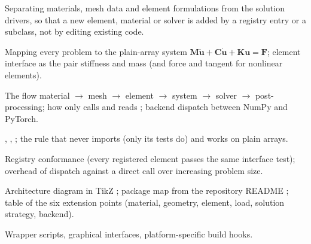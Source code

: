 \begin{description}[style=nextline,leftmargin=1em]
\item[Focus] Separating materials, mesh data and element formulations from the solution drivers, so that a new element, material or solver is added by a registry entry or a subclass, not by editing existing code.
\item[Mathematics] Mapping every problem to the plain-array system $\bm{M}\ddot{\bm u}+\bm{C}\dot{\bm u}+\bm{K}\bm u=\bm F$; element interface as the pair stiffness and mass (and force and tangent for nonlinear elements).
\item[Algorithm] The flow material $\to$ mesh $\to$ element $\to$ system $\to$ solver $\to$ post-processing; how  only calls  and reads ; backend dispatch between NumPy and PyTorch.
\item[Implementation] , , ; the rule that \rom{} never imports \fea{} (only its tests do) and works on plain arrays.
\item[Verification] Registry conformance (every registered element passes the same interface test); overhead of dispatch against a direct call over increasing problem size. 
\item[Figures and tables] Architecture diagram in TikZ ; package map from the repository README \have{}; table of the six extension points (material, geometry, element, load, solution strategy, backend).
\item[Exclusions] Wrapper scripts, graphical interfaces, platform-specific build hooks.
\end{description}

